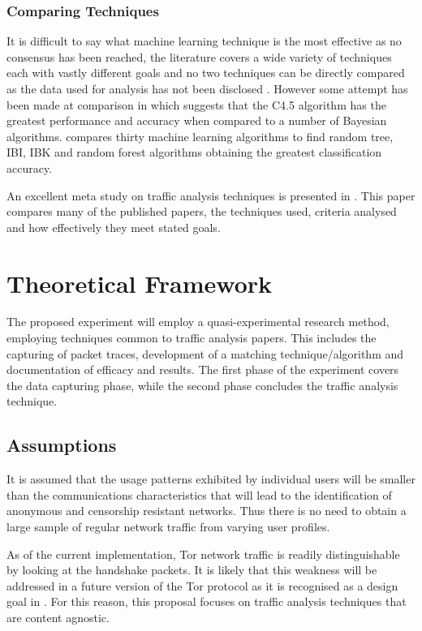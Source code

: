 \documentclass{conference}
\begin{document}
\subsubsection{Comparing Techniques}

It is difficult to say what machine learning technique is the most effective as no consensus has been reached, the literature covers a wide variety of techniques each with vastly different goals and no two techniques can be directly compared as the data used for analysis has not been disclosed \parencite{Kim:2007p3867}. However some attempt has been made at comparison in \textcite{Williams:2006p3849} which suggests that the C4.5 algorithm has the greatest performance and accuracy when compared to a number of Bayesian algorithms. \textcite{Mohd:2009p6484} compares thirty machine learning algorithms  to find random tree, IBI, IBK and random forest algorithms obtaining the greatest classification accuracy.

An excellent meta study on traffic analysis techniques is presented in \textcite{Nguyen:2008p3837}. This paper compares many of the published papers, the techniques used, criteria analysed and how effectively they meet stated goals.

\section{Theoretical Framework}

The proposed experiment will employ a quasi-experimental research method, employing techniques common to traffic analysis papers. This includes the capturing of packet traces, development of a matching technique/algorithm and documentation of efficacy and results. The first phase of the experiment covers the data capturing phase, while the second phase concludes the traffic analysis technique.

\subsection{Assumptions}

It is assumed that the usage patterns exhibited by individual users will be smaller than the communications characteristics that will lead to the identification of anonymous and censorship resistant networks. Thus there is no need to obtain a large sample of regular network traffic from varying user profiles.

As of the current implementation, Tor network traffic is readily distinguishable by looking at the handshake packets. It is likely that this weakness will be addressed in a future version of the Tor protocol as it is recognised as a design goal in \textcite{Dingledine:2008p1542}. For this reason, this proposal focuses on traffic analysis techniques that are content agnostic.
\end{document}
